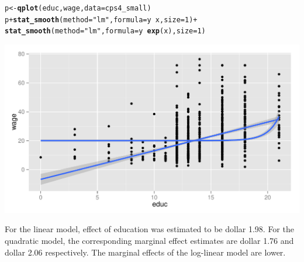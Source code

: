 \documentclass[a4paper]{article}\usepackage[]{graphicx}\usepackage[]{color}
\makeatletter
\def\maxwidth{ %
  \ifdim\Gin@nat@width>\linewidth
    \linewidth
  \else
    \Gin@nat@width
  \fi
}
\newcommand{\hlnum}[1]{\textcolor[rgb]{0.686,0.059,0.569}{#1}}%
\newcommand{\hlstr}[1]{\textcolor[rgb]{0.192,0.494,0.8}{#1}}%
\newcommand{\hlopt}[1]{\textcolor[rgb]{0,0,0}{#1}}%
\newcommand{\hlstd}[1]{\textcolor[rgb]{0.345,0.345,0.345}{#1}}%
\newcommand{\hlkwb}[1]{\textcolor[rgb]{0.69,0.353,0.396}{#1}}%
\newcommand{\hlkwc}[1]{\textcolor[rgb]{0.333,0.667,0.333}{#1}}%
\newcommand{\hlkwd}[1]{\textcolor[rgb]{0.737,0.353,0.396}{\textbf{#1}}}%
\newenvironment{kframe}{%
 \def\at@end@of@kframe{}%
 \ifinner\ifhmode%
  \def\at@end@of@kframe{\end{minipage}}%
  \begin{minipage}{\columnwidth}%
 \fi\fi%
 \def\FrameCommand##1{\hskip\@totalleftmargin \hskip-\fboxsep
 \colorbox{shadecolor}{##1}\hskip-\fboxsep
     \hskip-\linewidth \hskip-\@totalleftmargin \hskip\columnwidth}%
 \MakeFramed {\advance\hsize-\width
   \@totalleftmargin\z@ \linewidth\hsize
   \@setminipage}}%
 {\par\unskip\endMakeFramed%
 \at@end@of@kframe}
\newenvironment{knitrout}{}{} %
\makeatother
\begin{document}
\begin{knitrout}
\color{fgcolor}\begin{kframe}
\begin{alltt}
\hlstd{p} \hlkwb{<-} \hlkwd{qplot}\hlstd{(educ, wage,} \hlkwc{data} \hlstd{= cps4_small)}
\hlstd{p} \hlopt{+} \hlkwd{stat_smooth}\hlstd{(}\hlkwc{method} \hlstd{=} \hlstr{"lm"}\hlstd{,} \hlkwc{formula} \hlstd{= y} \hlopt{~} \hlstd{x,} \hlkwc{size} \hlstd{=} \hlnum{1}\hlstd{)} \hlopt{+}
\hlkwd{stat_smooth}\hlstd{(}\hlkwc{method} \hlstd{=} \hlstr{"lm"}\hlstd{,} \hlkwc{formula} \hlstd{= y} \hlopt{~} \hlkwd{exp}\hlstd{(x),} \hlkwc{size} \hlstd{=} \hlnum{1}\hlstd{)}
\end{alltt}
\end{kframe}
\includegraphics[width=\maxwidth]{figure/unnamed-chunk-10-1} 

\end{knitrout}

For the linear model, effect of education was estimated to be dollar 1.98. For the quadratic model, the corresponding marginal effect estimates are dollar 1.76 and dollar 2.06 respectively. The marginal effects of the log-linear model are lower.\\
\end{document}
